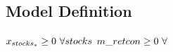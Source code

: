 \documentclass[11pt]{article}
\begin{document}
\subsection*{Model Definition}

\bigskip
$x_{stocks_{*}}\geq 0 ~ \forall stocks\\$
$m\_retcon\geq 0 ~ \forall \\$
\end{document}
